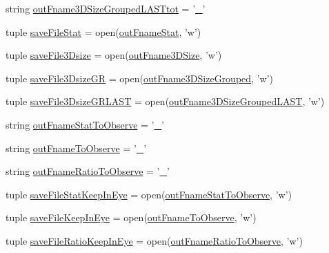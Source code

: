 \begin{DoxyCompactItemize}
\item 
string \hyperlink{namespacegeneral_statistics_ade201b7fa63723879eab1912ec6e0f48}{out\-Fname3\-D\-Size\-Grouped\-L\-A\-S\-Ttot} = '\hyperlink{start_8m_a280c5f85d1264d1df5d06bc5ea8b550c}{\-\_\-}'
\item 
tuple \hyperlink{namespacegeneral_statistics_a5db80fc99086fc28f22bf3c86c99ea41}{save\-File\-Stat} = open(\hyperlink{namespacegeneral_statistics_a3395f09c196abc5195fcdd3d4e04b564}{out\-Fname\-Stat}, 'w')
\item 
tuple \hyperlink{namespacegeneral_statistics_aab92303ab2917a1f41abe3a499f353dc}{save\-File3\-Dsize} = open(\hyperlink{namespacegeneral_statistics_af956e5e24f6fb8519c5142bd589caeca}{out\-Fname3\-D\-Size}, 'w')
\item 
tuple \hyperlink{namespacegeneral_statistics_acebe9590443db7047d11646821848b6c}{save\-File3\-Dsize\-G\-R} = open(\hyperlink{namespacegeneral_statistics_a0f53a86c9390e90115eaa38967ac1eab}{out\-Fname3\-D\-Size\-Grouped}, 'w')
\item 
tuple \hyperlink{namespacegeneral_statistics_a7dff4431bede759c68f27cb8b8ca3030}{save\-File3\-Dsize\-G\-R\-L\-A\-S\-T} = open(\hyperlink{namespacegeneral_statistics_a41b8a01562c7b02335cd9693c3e23742}{out\-Fname3\-D\-Size\-Grouped\-L\-A\-S\-T}, 'w')
\item 
string \hyperlink{namespacegeneral_statistics_aa2ed0468341b598ff719c6a531cd44c1}{out\-Fname\-Stat\-To\-Observe} = '\hyperlink{start_8m_a280c5f85d1264d1df5d06bc5ea8b550c}{\-\_\-}'
\item 
string \hyperlink{namespacegeneral_statistics_a26991f5cc2efbf935f14d32cea1991fc}{out\-Fname\-To\-Observe} = '\hyperlink{start_8m_a280c5f85d1264d1df5d06bc5ea8b550c}{\-\_\-}'
\item 
string \hyperlink{namespacegeneral_statistics_a208835711455a9a3ef08807b9d561de5}{out\-Fname\-Ratio\-To\-Observe} = '\hyperlink{start_8m_a280c5f85d1264d1df5d06bc5ea8b550c}{\-\_\-}'
\item 
tuple \hyperlink{namespacegeneral_statistics_a6d34190172987c2f4683421687406e59}{save\-File\-Stat\-Keep\-In\-Eye} = open(\hyperlink{namespacegeneral_statistics_aa2ed0468341b598ff719c6a531cd44c1}{out\-Fname\-Stat\-To\-Observe}, 'w')
\item 
tuple \hyperlink{namespacegeneral_statistics_acdda9c45b9c93c48ec480c6aeb1a5f57}{save\-File\-Keep\-In\-Eye} = open(\hyperlink{namespacegeneral_statistics_a26991f5cc2efbf935f14d32cea1991fc}{out\-Fname\-To\-Observe}, 'w')
\item 
tuple \hyperlink{namespacegeneral_statistics_ad9c5a196f37842caca2ecf19f8f1c6db}{save\-File\-Ratio\-Keep\-In\-Eye} = open(\hyperlink{namespacegeneral_statistics_a208835711455a9a3ef08807b9d561de5}{out\-Fname\-Ratio\-To\-Observe}, 'w')

\end{DoxyCompactItemize}
